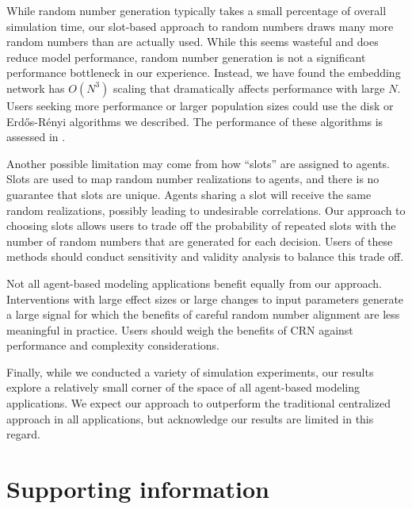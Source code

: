 \documentclass[10pt,letterpaper]{article}
\newcommand{\red}[1]{\textcolor{red}{#1}}
\newcommand{\er}{Erd{\H o}s-R{\'e}nyi }
\begin{document}
While random number generation typically takes a small percentage of overall simulation time, our slot-based approach to random numbers draws many more random numbers than are actually used. While this seems wasteful and does reduce model performance, random number generation is not a significant performance bottleneck in our experience. Instead, we have found the embedding network has $O(N^3)$ scaling that dramatically affects performance with large $N$. Users seeking more performance or larger population sizes could use the disk or \er algorithms we described. The performance of these algorithms is assessed in .

Another possible limitation may come from how ``slots'' are assigned to agents. Slots are used to map random number realizations to agents, and there is no guarantee that slots are unique. Agents sharing a slot will receive the same random realizations, possibly leading to undesirable correlations. Our approach to choosing slots allows users to trade off the probability of repeated slots with the number of random numbers that are generated for each decision. Users of these methods should conduct sensitivity and validity analysis to balance this trade off.

Not all agent-based modeling applications benefit equally from our approach. Interventions with large effect sizes or large changes to input parameters generate a large signal for which the benefits of careful random number alignment are less meaningful in practice. Users should weigh the benefits of CRN against performance and complexity considerations.

Finally, while we conducted a variety of simulation experiments, our results explore a relatively small corner of the space of all agent-based modeling applications. We expect our approach to outperform the traditional centralized approach in all applications, but acknowledge our results are limited in this regard.








\section*{Supporting information}
\end{document}
